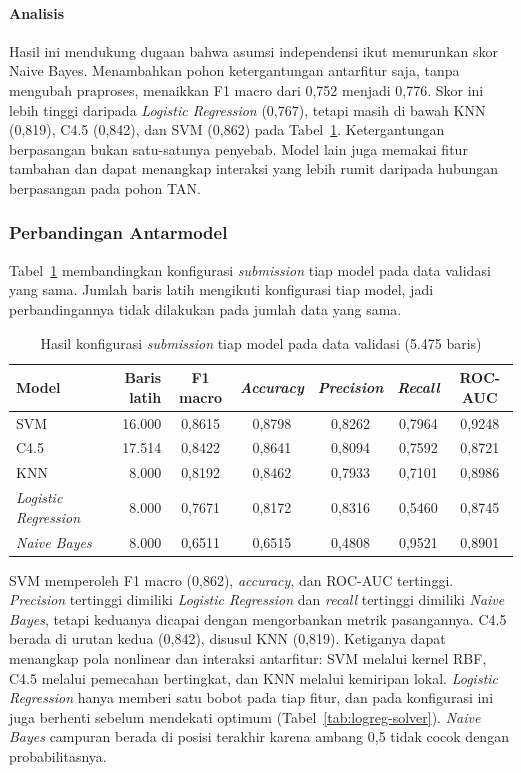 \paragraph{Analisis}
Hasil ini mendukung dugaan bahwa asumsi independensi ikut menurunkan skor
Naive Bayes. Menambahkan pohon ketergantungan antarfitur saja, tanpa
mengubah praproses, menaikkan F1 macro dari 0,752 menjadi 0,776. Skor ini
lebih tinggi daripada \textit{Logistic Regression} (0,767), tetapi masih di
bawah KNN (0,819), C4.5 (0,842), dan SVM (0,862) pada
Tabel~\ref{tab:hasil}. Ketergantungan berpasangan bukan satu-satunya
penyebab. Model lain juga memakai fitur tambahan dan dapat menangkap
interaksi yang lebih rumit daripada hubungan berpasangan pada pohon TAN.

\subsubsection{Perbandingan Antarmodel}

Tabel~\ref{tab:hasil} membandingkan konfigurasi \textit{submission} tiap
model pada data validasi yang sama. Jumlah baris latih mengikuti
konfigurasi tiap model, jadi perbandingannya tidak dilakukan pada jumlah
data yang sama.

\begin{table}[H]
\centering
\small
\caption{Hasil konfigurasi \textit{submission} tiap model pada data validasi (5.475 baris)}
\label{tab:hasil}
\setlength{\tabcolsep}{4pt}
\begin{tabular}{@{}lrccccc@{}}
\toprule
Model & Baris latih & F1 macro & \textit{Accuracy} & \textit{Precision} & \textit{Recall} & ROC-AUC \\
\midrule
SVM & 16.000 & 0,8615 & 0,8798 & 0,8262 & 0,7964 & 0,9248 \\
C4.5 & 17.514 & 0,8422 & 0,8641 & 0,8094 & 0,7592 & 0,8721 \\
KNN & 8.000 & 0,8192 & 0,8462 & 0,7933 & 0,7101 & 0,8986 \\
\textit{Logistic Regression} & 8.000 & 0,7671 & 0,8172 & 0,8316 & 0,5460 & 0,8745 \\
\textit{Naive Bayes} & 8.000 & 0,6511 & 0,6515 & 0,4808 & 0,9521 & 0,8901 \\
\bottomrule
\end{tabular}
\end{table}

SVM memperoleh F1 macro (0,862), \textit{accuracy}, dan ROC-AUC tertinggi.
\textit{Precision} tertinggi dimiliki \textit{Logistic Regression} dan
\textit{recall} tertinggi dimiliki \textit{Naive Bayes}, tetapi keduanya
dicapai dengan mengorbankan metrik pasangannya. C4.5 berada di urutan kedua (0,842), disusul KNN
(0,819). Ketiganya dapat menangkap pola nonlinear dan interaksi antarfitur:
SVM melalui kernel RBF, C4.5 melalui pemecahan bertingkat, dan KNN melalui
kemiripan lokal. \textit{Logistic Regression} hanya memberi satu bobot pada
tiap fitur, dan pada konfigurasi ini juga berhenti sebelum mendekati optimum
(Tabel~\ref{tab:logreg-solver}). \textit{Naive Bayes} campuran berada di
posisi terakhir karena ambang 0,5 tidak cocok dengan probabilitasnya.

